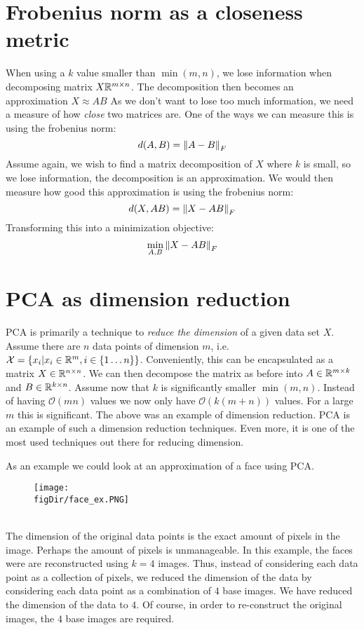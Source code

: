 \section{Frobenius norm as a closeness metric}
\label{sec:frobenius}
When using a $k$ value smaller than $\min(m, n)$, we lose 
information when decomposing matrix $X \mathbb{R}^{m\times n}$.
The decomposition then becomes an approximation $X \approx AB$
As we don't want to lose too much information, we need a 
measure of how \textit{close} two matrices are. 
One of the ways we can measure this is using the frobenius norm:
\begin{equation}
	d(A, B) = \left\lVert A - B\right\rVert_F
\end{equation}
Assume again, we wish to find a matrix decomposition of $X$ where 
$k$ is small, so we lose information, the decomposition is
an approximation. We would then measure how good this approximation
is using the frobenius norm:
\begin{equation}
	d(X,AB) = \left\lVert X - AB\right\rVert_F
\end{equation}
Transforming this into a minimization objective:
\begin{equation}
	\underset{A,B}{\min}\left\lVert X - AB\right\rVert_F
\end{equation}
	
\section{PCA as dimension reduction}
PCA is primarily a technique to \textit{reduce the dimension} of 
a given data set $X$. Assume there are $n$ data points
of dimension $m$, i.e.
$\mathcal{X} = \{x_i| x_i \in \mathbb{R}^m, i \in \{1\dots n\}\}$.
Conveniently, this can be encapsulated as a matrix 
$X \in \mathbb{R}^{n \times n}$. We can then decompose the 
matrix as before into $A \in \mathbb{R}^{m \times k}$ and 
$B \in \mathbb{R}^{k \times n}$. Assume now that $k$ is 
significantly smaller $\min(m,n)$. Instead of having 
$\mathcal{O}(mn)$ values we now only have $\mathcal{O}(k(m+n))$
values. For a large $m$ this is significant. The above
was an example of dimension reduction. PCA is an example of 
such a dimension reduction techniques. Even more, it is 
one of the most used techniques out there for reducing dimension.

\begin{exmp}
As an example we could look at an approximation of a face using PCA.
\begin{figure}[h!]
	\centering
	\texttt{[image: \\figDir/face\_ex.PNG]}
\end{figure}\\
The dimension of the original data points is the 
exact amount of pixels in the image. Perhaps the amount
of pixels is unmanageable. In this example, the faces were
are reconstructed using $k=4$ images. Thus, instead of 
considering each data point as a collection of pixels,
we reduced the dimension of the data by considering each data 
point as a combination of $4$ base images. We have reduced 
the dimension of the data to $4$. Of course, in order 
to re-construct the original images, the $4$ base images 
are required.
\end{exmp}

